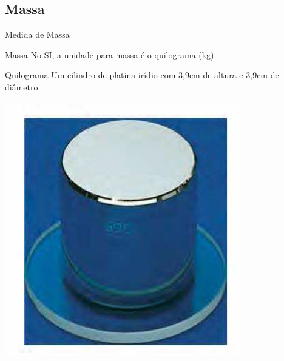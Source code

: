 \documentclass[xcolor=dvipsnames,table]{beamer}
\begin{document}
	\subsection{Massa}
	\begin{frame}{Medida de Massa}
		\begin{block}{Massa}
			No SI, a unidade para massa é o quilograma (kg).
		\end{block}
		\begin{block}{Quilograma}
			Um cilindro de platina irídio com 3,9cm de altura e 3,9cm de diâmetro.
		\end{block}
		\begin{center}
			\includegraphics[scale=0.3]{images/figura1-3.png}
		\end{center}
	\end{frame}
	
\end{document}
